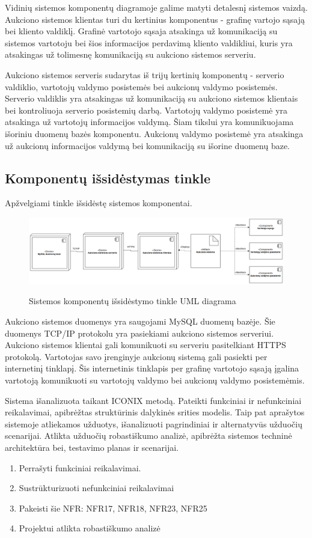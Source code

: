 \documentclass{VUMIFPSkursinis}
\begin{document}
	Vidinių sistemos komponentų diagramoje galime matyti detalesnį sistemos vaizdą. Aukciono sistemos klientas turi du kertinius komponentus - grafinę vartojo sąsają bei kliento valdiklį. Grafinė vartotojo sąsaja atsakinga už komunikaciją su sistemos vartotoju bei šios informacijos perdavimą kliento valdikliui, kuris yra atsakingas už tolimesnę komunikaciją su aukciono sistemos serveriu.
	
	Aukciono sistemos serveris sudarytas iš trijų kertinių komponentų - serverio valdiklio, vartotojų valdymo posistemės bei aukcionų valdymo posistemės. Serverio valdiklis yra atsakingas už komunikaciją su aukciono sistemos klientais bei kontroliuoja serverio posistemių darbą. Vartotojų valdymo posistemė yra atsakinga už vartotojų informacijos valdymą. Šiam tikslui yra komunikuojama išoriniu duomenų bazės komponentu. Aukcionų valdymo posistemė yra atsakinga už aukcionų informacijos valdymą bei komunikaciją su išorine duomenų baze.
	
	\newpage
	
	\subsection{Komponentų išsidėstymas tinkle}
	Apžvelgiami tinkle išsidėstę sistemos komponentai.
	\begin{figure}[H]
		\centering
		\includegraphics[width=\linewidth]{img/umlNetworkComponentDiagram.png}
		\label{fig:aukckoreg}
		\caption{Sistemos komponentų išsidėstymo tinkle UML diagrama}
	\end{figure}
	
	Aukciono sistemos duomenys yra saugojami MySQL duomenų bazėje. Šie duomenys TCP/IP protokolu yra pasiekiami aukciono sistemos serveriui. Aukciono sistemos klientai gali komunikuoti su serveriu pasitelkiant HTTPS protokolą. Vartotojas savo įrenginyje aukcionų sistemą gali pasiekti per internetinį tinklapį. Šis internetinis tinklapis per grafinę vartotojo sąsają įgalina vartotoją komunikuoti su vartotojų valdymo bei aukcionų valdymo posistemėmis.
	
	\newpage
	
	Sistema išanalizuota taikant ICONIX metodą. Pateikti funkciniai ir nefunkciniai reikalavimai, apibrėžtas struktūrinis dalykinės srities modelis. Taip pat aprašytos sistemoje atliekamos užduotys, išanalizuoti pagrindiniai ir alternatyvūs užduočių scenarijai. Atlikta užduočių robastiškumo analizė, apibrėžta sistemos techninė architektūra bei, testavimo planas ir scenarijai.
	\newpage
	
		\begin{enumerate}
		\item Perrašyti funkciniai reikalavimai.
		\item Sustrūkturizuoti nefunkciniai reikalavimai
		\item  Pakeisti šie NFR: NFR17, NFR18, NFR23, NFR25
		\item Projektui atlikta robastiškumo analizė
	\end{enumerate}
\end{document}
